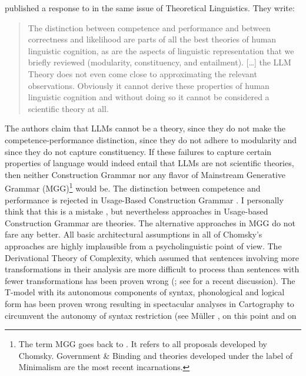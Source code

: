 \citet{FoxKatzir2024a} published a response to  in the same issue of
Theoretical Linguistics. They write:
\begin{quote}
The distinction between competence and performance and between correctness and likelihood are parts
of all the best theories of human linguistic cognition, as are the aspects of linguistic
representation that we briefly reviewed (modularity, constituency, and entailment). [\ldots]
the LLM Theory does not even come close to approximating the relevant observations. Obviously it
cannot derive these properties of human linguistic cognition and without doing so it cannot be
considered a scientific theory at all. \citep[]{FoxKatzir2024a}
\end{quote}
The authors claim that LLMs cannot be a theory, since they do not make the competence-performance
distinction, since they do not adhere to modularity and since they do not capture constituency. If
these failures to capture certain properties of language would indeed entail that LLMs are not
scientific theories, then neither Construction Grammar nor any flavor of Mainstream Generative
Grammar (MGG)\footnote{%
  The term MGG goes back to \citet[]{CJ2005a}. It refers to all proposals developed by
  Chomsky. Government \& Binding \citep{Chomsky81a} and theories developed under the label of
  Minimalism \citep{Chomsky95a-u} are the most recent incarnations. 
} would be. The distinction between competence and performance is rejected in
Usage-Based Construction Grammar \citep[]{Diessel2015a-u}. I personally think that this is
a mistake \citep[Chapter~15]{MuellerGT-Eng5}, but nevertheless approaches in Usage-based Construction
Grammar are theories. The alternative approaches in MGG do not fare any better. All basic
architectural assumptions in all of Chomsky's approaches are highly implausible from a
psycholinguistic point of view. The Derivational Theory of Complexity, which assumed that sentences
involving more transformations in their analysis are more difficult to process than sentences with
fewer transformations has been proven wrong (\citealt[--328]{FBG74a-u}; see
\citealt[Chapter~15.1]{MuellerGT-Eng5} for a recent discussion). The T-model with its autonomous components of 
syntax, phonological and logical form has been
proven wrong resulting in spectacular analyses in Cartography \citep{CR2010a} to circumvent the
autonomy of syntax restriction (see Müller \citeyear[Section~4.6.1.1]{MuellerGT-Eng5}, \citeyear[Section~4.10.2]{MuellerGermanic} on this point and on
